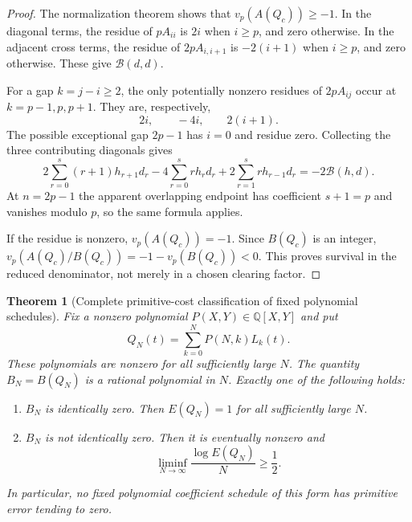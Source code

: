 \documentclass[11pt,a4paper]{article}
\newtheorem{theorem}{Theorem}[section]
\theoremstyle{definition}
\theoremstyle{remark}
\begin{document}
\begin{proof}
The normalization theorem shows that $v_p(A(Q_c))\ge-1$.
In the diagonal terms, the residue of $pA_{ii}$ is $2i$ when $i\ge p$,
and zero otherwise. In the adjacent cross terms, the residue of
$2pA_{i,i+1}$ is $-2(i+1)$ when $i\ge p$, and zero otherwise.
These give $\mathcal B(d,d)$.

For a gap $k=j-i\ge2$, the only potentially nonzero residues of
$2pA_{ij}$ occur at $k=p-1,p,p+1$. They are, respectively,
\[
 2i,\qquad -4i,\qquad 2(i+1).
\]
The possible exceptional gap $2p-1$ has $i=0$ and residue zero.
Collecting the three contributing diagonals gives
\[
 2\sum_{r=0}^{s}(r+1)h_{r+1}d_r
 -4\sum_{r=0}^{s}r h_rd_r
 +2\sum_{r=1}^{s}r h_{r-1}d_r
 =-2\mathcal B(h,d).
\]
At $n=2p-1$ the apparent overlapping endpoint has coefficient $s+1=p$
and vanishes modulo $p$, so the same formula applies.

If the residue is nonzero, $v_p(A(Q_c))=-1$. Since $B(Q_c)$ is an
integer, $v_p(A(Q_c)/B(Q_c))=-1-v_p(B(Q_c))<0$. This proves survival
in the reduced denominator, not merely in a chosen clearing factor.
\end{proof}

\begin{theorem}[Complete primitive-cost classification of fixed polynomial schedules]
\label{next-square-polynomial-filter}
Fix a nonzero polynomial $P(X,Y)\in\mathbb Q[X,Y]$ and put
\[
 Q_N(t)=\sum_{k=0}^N P(N,k)L_k(t).
\]
These polynomials are nonzero for all sufficiently large $N$.
The quantity $B_N=B(Q_N)$ is a rational polynomial in $N$.
Exactly one of the following holds:
\begin{enumerate}
\item $B_N$ is identically zero. Then $E(Q_N)=1$ for all sufficiently
large $N$.
\item $B_N$ is not identically zero. Then it is eventually nonzero and
\[
 \liminf_{N\to\infty}\frac{\log E(Q_N)}{N}\ge\frac12.
\]
\end{enumerate}
In particular, no fixed polynomial coefficient schedule of this form
has primitive error tending to zero.
\end{theorem}
\end{document}
